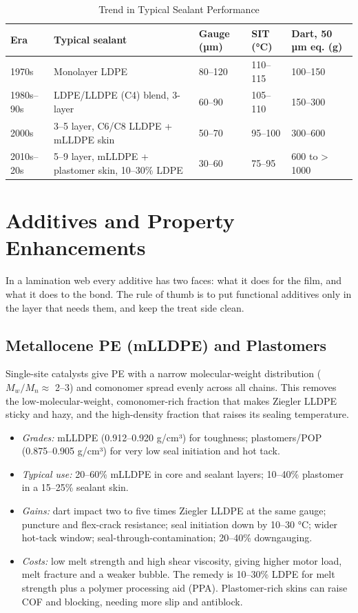 \documentclass[10pt,twocolumn,a4paper]{article}
\begin{document}
\begin{table}[!t]
\caption{Trend in Typical Sealant Performance}
\label{tab:trend}
\footnotesize
\begin{tabularx}{\columnwidth}{@{}p{11mm}Lp{10mm}p{10mm}p{13mm}@{}}
\toprule
\textbf{Era} & \textbf{Typical sealant} & \textbf{Gauge (µm)} & \textbf{SIT (°C)} & \textbf{Dart, 50 µm eq. (g)}\\
\midrule
1970s & Monolayer LDPE & 80–120 & 110–115 & 100–150\\
1980s–90s & LDPE/LLDPE (C4) blend, 3-layer & 60–90 & 105–110 & 150–300\\
2000s & 3–5 layer, C6/C8 LLDPE + mLLDPE skin & 50–70 & 95–100 & 300–600\\
2010s–20s & 5–9 layer, mLLDPE + plastomer skin, 10–30\% LDPE & 30–60 & 75–95 & 600 to > 1000\\
\bottomrule
\end{tabularx}
\end{table}

\section{Additives and Property Enhancements}
\label{sec:add}

In a lamination web every additive has two faces: what it does for the film, and what it does to the bond. The rule of thumb is to put functional additives only in the layer that needs them, and keep the treat side clean.

\subsection{Metallocene PE (mLLDPE) and Plastomers}

Single-site catalysts give PE with a narrow molecular-weight distribution ($M_w/M_n \approx$ 2–3) and comonomer spread evenly across all chains. This removes the low-molecular-weight, comonomer-rich fraction that makes Ziegler LLDPE sticky and hazy, and the high-density fraction that raises its sealing temperature.
\begin{itemize}\setlength\itemsep{1pt}
\item \textit{Grades:} mLLDPE (0.912–0.920 g/cm³) for toughness; plastomers/POP (0.875–0.905 g/cm³) for very low seal initiation and hot tack.
\item \textit{Typical use:} 20–60\% mLLDPE in core and sealant layers; 10–40\% plastomer in a 15–25\% sealant skin.
\item \textit{Gains:} dart impact two to five times Ziegler LLDPE at the same gauge; puncture and flex-crack resistance; seal initiation down by 10–30 °C; wider hot-tack window; seal-through-contamination; 20–40\% downgauging.
\item \textit{Costs:} low melt strength and high shear viscosity, giving higher motor load, melt fracture and a weaker bubble. The remedy is 10–30\% LDPE for melt strength plus a polymer processing aid (PPA). Plastomer-rich skins can raise COF and blocking, needing more slip and antiblock.
\end{itemize}
\end{document}
